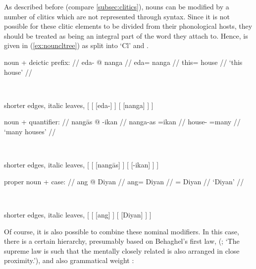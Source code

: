 \xe

As described before (compare \autoref{subsec:clitics}), nouns can be modified
by a number of clitics which are not represented through syntax. Since it is
not possible for these clitic elements to be divided from their phonological
hosts, they should be treated as being an integral part of the word they attach
to. Hence,  is given in (\ref{ex:nouncltree}) as split into `Cl' and
.

\pex\label{ex:nouncltree}
\a %
	\begin{minipage}[t]{.5\remaining}
	\begingl
		\glpreamble noun + deictic prefix: //
		\gla eda- @ nanga //
		\glb eda= nanga //
		\glc this= house //
		\glft `this house' //
	\endgl
	\end{minipage}
	~
	\begin{forest} shorter edges, italic leaves,
	[
		[
			[eda-]
		]
		[
			[nanga]
		]
	]
	\end{forest}

\a %
	\begin{minipage}[t]{.5\remaining}
	\begingl
		\glpreamble noun + quantifier: //
		\gla nangās @ -ikan //
		\glb nanga-as =ikan //
		\glc house-\Parg{} =many //
		\glft `many houses' //
	\endgl
	\end{minipage}
	~
	\begin{forest} shorter edges, italic leaves,
	[
		[
			[nangās]
		]
		[
			[-ikan]
		]
	]
	\end{forest}

\a %
	\begin{minipage}[t]{.5\remaining}
	\begingl
		\glpreamble proper noun + case: //
		\gla ang @ Diyan //
		\glb ang= Diyan //
		\glc \Aarg{}= Diyan //
		\glft `Diyan' //
	\endgl
	\end{minipage}
	~
	\begin{forest} shorter edges, italic leaves,
	[
		[
			[ang]
		]
		[
			[Diyan]
		]
	]
	\end{forest}

\xe

Of course, it is also possible to combine these nominal modifiers. In this
case, there is a certain hierarchy, presumably based on Behaghel's first law,
 (\cite[4]{behaghel1932}; `The supreme law is
such that the mentally closely related is also arranged in close proximity.'), 
and also grammatical weight \citep{wasow1997}:

